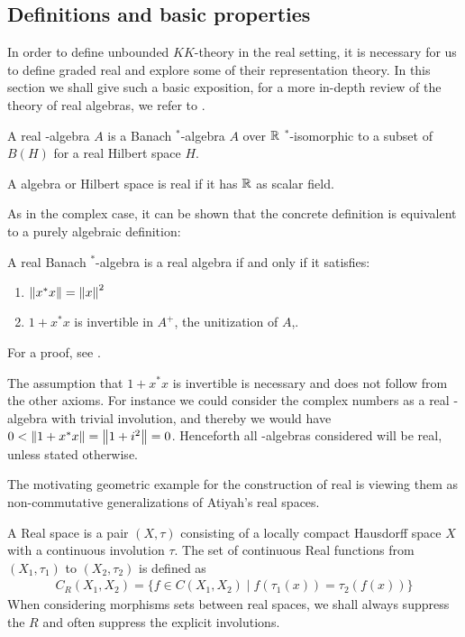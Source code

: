 \subsection{Definitions and basic properties}
In order to define unbounded $KK$-theory in the real setting, it is necessary for us to define graded real \Cstar and explore some of their representation theory. In this section we shall give such a basic exposition, for a more in-depth review of the theory of real \Cstar algebras, we refer to \cite{goodearl}. 
\begin{definition}
A real \Cstar-algebra $A$ is a Banach $^*$-algebra $A$ over $\mathbb{R}$ $^*$-isomorphic to a subset of $B(H)$ for a real Hilbert space $H$. 
\end{definition}
\begin{remark}
	A \Cstar algebra or Hilbert space is real if it has $\mathbb{R}$ as scalar field. 
\end{remark}
\noindent As in the complex case, it can be shown that the concrete definition is equivalent to a purely algebraic definition:
\begin{theorem}
A real Banach $^*$-algebra is a real \Cstar algebra if and only if it satisfies: 
\begin{enumerate}
\item
	$\left \Vert x^*x \right \Vert=\left \Vert x \right \Vert^2$
\item
	$1+x^*x$ is invertible in $A^+$, the unitization of $A$,. 
\end{enumerate}
\end{theorem}
For a proof, see \cite{goodearl}.
\begin{remark}
	The assumption that $1+x^*x$ is invertible is necessary and does not follow from the other axioms. For instance we could consider the complex numbers as a real \Cstar-algebra with trivial involution, and thereby we would have $0<\left \Vert 1+x^*x \right \Vert=\left \Vert 1+i^2 \right \Vert=0$. Henceforth all \Cstar-algebras considered will be real, unless stated otherwise. 
\end{remark}
The motivating geometric example for the construction of real \Cstar is viewing them as non-commutative generalizations of Atiyah's real spaces. 
\begin{definition}
	A Real space is a pair $(X,\tau)$ consisting of a locally compact Hausdorff space $X$ with a continuous involution $\tau$. The set of continuous Real functions from $(X_1,\tau_1)$ to $(X_2,\tau_2)$ is defined as 
	\begin{align*}
		C_R(X_1,X_2)=\{f\in C(X_1,X_2) \mid f(\tau_1(x))=\tau_2(f(x))\}
	\end{align*}
	When considering morphisms sets between real spaces, we shall always suppress the $R$ and often suppress the explicit involutions.  
\end{definition}
